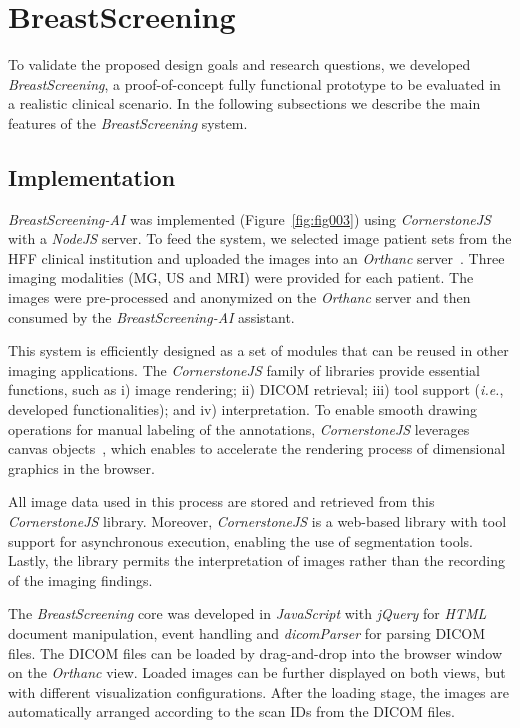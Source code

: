 \section{BreastScreening}
\label{sec:system}
To validate the proposed design goals and research questions, we developed {\it BreastScreening}, a proof-of-concept fully functional prototype to be evaluated in a realistic clinical scenario. In the following subsections we describe the main features of the {\it BreastScreening} system.

\subsection{Implementation}

{\it BreastScreening-AI} was implemented (Figure~\ref{fig:fig003}) using {\it CornerstoneJS} \cite{urban2017lesiontracker} with a {\it NodeJS} server.
To feed the system, we selected image patient sets from the HFF clinical institution and uploaded the images into an {\it Orthanc} server~\cite{Jodogne2018}.
Three imaging modalities (MG, US and MRI) were provided for each patient.
The images were pre-processed and anonymized on the {\it Orthanc} server and then consumed by the {\it BreastScreening-AI} assistant.

This system is efficiently designed as a set of modules that can be reused in other imaging applications.
The {\it CornerstoneJS} family of libraries provide essential functions, such as i) image rendering; ii) DICOM retrieval; iii) tool support ({\em i.e.}, developed functionalities); and iv) interpretation.
To enable smooth drawing operations for manual labeling of the annotations, {\it CornerstoneJS} leverages canvas objects~\cite{mullie2019coreslicer}, which enables to accelerate the rendering process of dimensional graphics in the browser.

All image data used in this process are stored and retrieved from this {\it CornerstoneJS} library.
Moreover, {\it CornerstoneJS} is a web-based library with tool support for asynchronous execution, enabling the use of segmentation tools.
Lastly, the library permits the interpretation of images rather than the recording of the imaging findings.

The {\it BreastScreening} core was developed in {\it JavaScript} with {\it jQuery} for {\it HTML} document manipulation, event handling and {\it dicomParser} for parsing DICOM files.
The DICOM files can be loaded by drag-and-drop into the browser window on the {\it Orthanc} view.
Loaded images can be further displayed on both views, but with different visualization configurations.
After the loading stage, the images are automatically arranged according to the scan IDs from the DICOM files.

